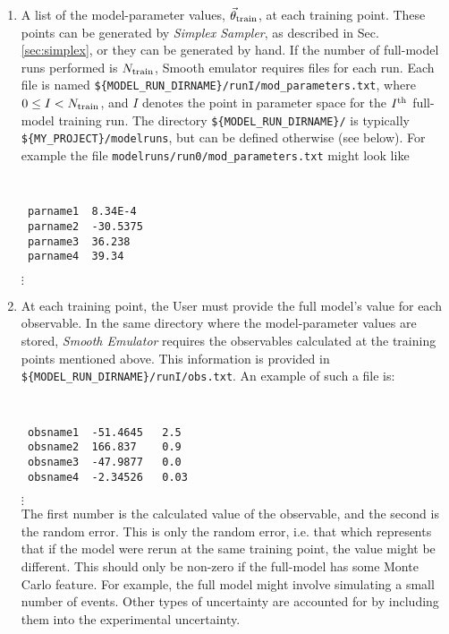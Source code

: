 \documentclass[UserManual.tex]{subfiles}
\begin{document}
\begin{enumerate}
\item A list of the model-parameter values, $\vec{\theta}_{\rm train}$, at each training point. These points can be generated by {\it Simplex Sampler}, as described in Sec. \ref{sec:simplex}, or they can be generated by hand. If the number of full-model runs performed is $N_{\rm train}$, Smooth emulator requires files for each run. Each file is named {\tt \$\{MODEL\_RUN\_DIRNAME\}/runI/mod\_parameters.txt}, where $0\le I<N_{\rm train}$, and $I$ denotes the point in  parameter space for the $I^{\rm th}$ full-model training run. The directory {\tt \$\{MODEL\_RUN\_DIRNAME\}/} is typically {\tt \$\{MY\_PROJECT\}/modelruns}, but can be defined otherwise (see below). For example the file {\tt modelruns/run0/mod\_parameters.txt} might look like
{\tt
\begin{verbatim}
 parname1  8.34E-4
 parname2  -30.5375
 parname3  36.238
 parname4  39.34
\end{verbatim}}
\vspace*{-16pt}
 \hspace*{28pt}$\vdots$\\

\item At each training point, the User must provide the full model's value for each observable. In the same directory where the model-parameter values are stored, {\it Smooth Emulator} requires the observables calculated at the training points mentioned above. This information is provided in {\tt \$\{MODEL\_RUN\_DIRNAME\}/runI/obs.txt}. An example of such a file is:
{\tt
\begin{verbatim}
 obsname1  -51.4645   2.5
 obsname2  166.837    0.9
 obsname3  -47.9877   0.0
 obsname4  -2.34526   0.03
\end{verbatim}}
\vspace*{-16pt}
 \hspace*{28pt}$\vdots$\\
The first number is the calculated value of the observable, and the second is the random error. This is only the random error, i.e. that which represents that if the model were rerun at the same training point, the value might be different. This should only be non-zero if the full-model has some Monte Carlo feature. For example, the full model might involve simulating a small number of events. Other types of uncertainty are accounted for by including them into the experimental uncertainty.


\end{enumerate}
\end{document}
